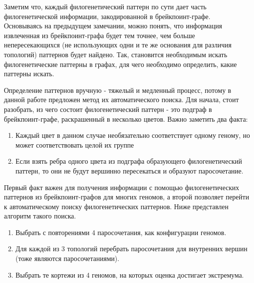 Заметим что, каждый филогенетический паттерн по сути дает часть филогенетической информации, закодированной в брейкпоинт-графе.
Основываясь на предыдущем замечании, можно понять, что информация извлеченная из брейкпоинт-графа будет тем точнее,
чем больше непересекающихся (не использующих одни и те же основания для различия топологий) паттернов будет найдено.
Так, становится необходимым искать филогенетические паттерны в графах, для чего необходимо определить, какие паттерны искать.

Определение паттернов вручную - тяжелый и медленный процесс, потому в данной работе предложен метод их автоматического поиска.
Для начала, стоит разобрать, из чего состоит филогенетический паттерн - это подграф в брейкпоинт-графе, раскрашенный в несколько цветов.
Важно заметить два факта:
\begin{enumerate}
  \item Каждый цвет в данном случае необязательно соответствует одному геному, но может соответствовать целой их группе
  \item Если взять ребра одного цвета из подграфа образующего филогенетический паттерн, то они не будут вершинно пересекаться и образуют паросочетание.
\end{enumerate}

Первый факт важен для получения информации с помощью филогенетических паттернов из брейкпоинт-графов для многих геномов,
а второй позволяет перейти к автоматическому поиску филогенетических паттернов.
Ниже представлен алгоритм такого поиска.
\begin{enumerate}
  \item Выбрать с повторениями 4 паросочетания, как конфигурации геномов.
  \item Для каждой из 3 топологий перебрать паросочетания для внутренних вершин (тоже являются паросочетаниями).
  \item Выбрать те кортежи из 4 геномов, на которых оценка достигает экстремума.
\end{enumerate}

